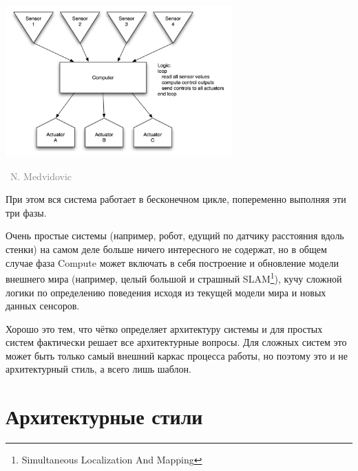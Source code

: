 \documentclass[a5paper]{article}
\newcommand{\attribution}[1] {
    \vspace{-4mm}\begin{flushright}\begin{scriptsize}\textcolor{gray}
    {\textcopyright\, #1}\end{scriptsize}\end{flushright}
}
\begin{document}
\begin{center}
    \includegraphics[width=0.65\textwidth]{senseComputeControl.png}
    \attribution{N. Medvidovic}
\end{center}

При этом вся система работает в бесконечном цикле, попеременно выполняя эти три фазы.

Очень простые системы (например, робот, едущий по датчику расстояния вдоль стенки) на самом деле больше ничего интересного не содержат, но в общем случае фаза Compute может включать в себя построение и обновление модели внешнего мира (например, целый большой и страшный SLAM\footnote{Simultaneous Localization And Mapping}), кучу сложной логики по определению поведения исходя из текущей модели мира и новых данных сенсоров.

Хорошо это тем, что чётко определяет архитектуру системы и для простых систем фактически решает все архитектурные вопросы. Для сложных систем это может быть только самый внешний каркас процесса работы, но поэтому это и не архитектурный стиль, а всего лишь шаблон.

\section{Архитектурные стили}
\end{document}
